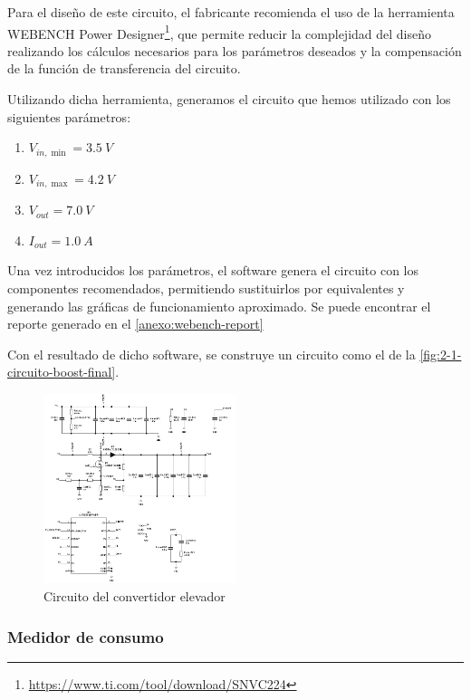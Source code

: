 Para el diseño de este circuito, el fabricante recomienda el uso de la herramienta WEBENCH Power Designer\footnote{\url{https://www.ti.com/tool/download/SNVC224}}, que permite reducir la complejidad del diseño realizando los cálculos necesarios para los parámetros deseados y la compensación de la función de transferencia del circuito. 

Utilizando dicha herramienta, generamos el circuito que hemos utilizado con los siguientes parámetros: 
\begin{enumerate}
    \item $V_{in, \min} = 3.5\ V$
    \item $V_{in, \max} = 4.2\ V$
    \item $V_{out} = 7.0\ V$
    \item $I_{out} = 1.0\ A$
\end{enumerate}

Una vez introducidos los parámetros, el software genera el circuito con los componentes recomendados, permitiendo sustituirlos por equivalentes y generando las gráficas de funcionamiento aproximado. Se puede encontrar el reporte generado en el \autoref{anexo:webench-report}

Con el resultado de dicho software, se construye un circuito como el de la \autoref{fig:2-1-circuito-boost-final}.

\begin{figure}[h]
    \centering
    \includegraphics[width=0.5\textwidth]{images/2/2-1/circuitoElevador.png}
    \caption{Circuito del convertidor elevador}
    \label{fig:2-1-circuito-boost-final}
\end{figure}

\subsubsection{Medidor de consumo}
\label{subsubsec:medidor-consumo-analog}

